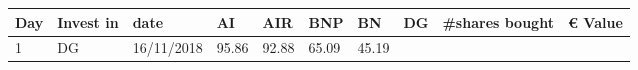 \documentclass[
  11pt,
]{article}
\begin{document}
\begin{longtable}[]{@{}llllllllll@{}}
\begin{minipage}[b]{0.04\columnwidth}
Day\strut
\end{minipage} & \begin{minipage}[b]{0.09\columnwidth}\raggedright
Invest in\strut
\end{minipage} & \begin{minipage}[b]{0.10\columnwidth}\raggedright
date\strut
\end{minipage} & \begin{minipage}[b]{0.06\columnwidth}\raggedright
AI\strut
\end{minipage} & \begin{minipage}[b]{0.06\columnwidth}\raggedright
AIR\strut
\end{minipage} & \begin{minipage}[b]{0.06\columnwidth}\raggedright
BNP\strut
\end{minipage} & \begin{minipage}[b]{0.06\columnwidth}\raggedright
BN\strut
\end{minipage} & \begin{minipage}[b]{0.06\columnwidth}\raggedright
DG\strut
\end{minipage} & \begin{minipage}[b]{0.13\columnwidth}\raggedright
\#shares bought\strut
\end{minipage} & \begin{minipage}[b]{0.08\columnwidth}\raggedright
€ Value\strut
\end{minipage}\tabularnewline
\midrule
\endhead
\begin{minipage}[t]{0.04\columnwidth}\raggedright
1\strut
\end{minipage} & \begin{minipage}[t]{0.09\columnwidth}\raggedright
DG\strut
\end{minipage} & \begin{minipage}[t]{0.10\columnwidth}\raggedright
16/11/2018\strut
\end{minipage} & \begin{minipage}[t]{0.06\columnwidth}\raggedright
95.86\strut
\end{minipage} & \begin{minipage}[t]{0.06\columnwidth}\raggedright
92.88\strut
\end{minipage} & \begin{minipage}[t]{0.06\columnwidth}\raggedright
65.09\strut
\end{minipage} & \begin{minipage}[t]{0.06\columnwidth}\raggedright
45.19\strut
\end{minipage} & \begin{minipage}[t]{0.06\columnwidth}\raggedright

\end{minipage}
\end{longtable}
\end{document}
